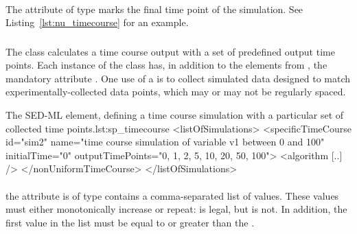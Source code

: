 \begin{blockChanged}
\paragraph*{}
\label{sec:nu_outputEndTime}
The attribute  of type  marks the final time point of the simulation. See Listing~\ref{lst:nu_timecourse} for an example. 

\end{blockChanged}

\begin{blockChanged}
\subsubsection{}
\label{class:specificTimeCourse}
The \SpecificTimeCourse class calculates a time course output with a set of predefined output time points.  Each instance of the \SpecificTimeCourse class has, in addition to the elements from \TimeCourse, the mandatory attribute \hyperref[sec:outputTimePoints]{}. One use of a \SpecificTimeCourse is to collect simulated data designed to match experimentally-collected data points, which may or may not be regularly spaced.

\begin{myXmlLst}{The SED-ML  element, defining a time course simulation with a particular set of collected time points.}{lst:sp_timecourse}
<listOfSimulations>
	<specificTimeCourse id="sim2"  name="time course simulation of variable v1 between 0 and 100"  
		initialTime="0" outputTimePoints="0, 1, 2, 5, 10, 20, 50, 100">
		<algorithm [..] />
 	</nonUniformTimeCourse>
</listOfSimulations>
\end{myXmlLst}

\paragraph*{}
\label{sec:outputTimePoints}
the  attribute is of type  contains a comma-separated list of values.  These values must either monotonically increase or repeat:   is legal, but  is not.  In addition, the first value in the list must be equal to or greater than the \hyperref[sec:initialTime]{}.

\end{blockChanged}

